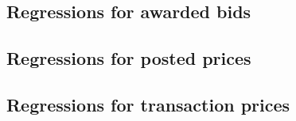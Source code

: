 \subsection{Regressions for awarded bids}




\subsection{Regressions for posted prices}



\subsection{Regressions for transaction prices}


